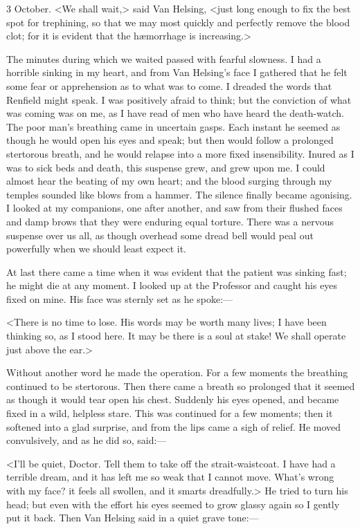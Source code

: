 \begin{diary}{3 October.}
<We shall wait,> said Van Helsing, <just long enough to fix the best spot for trephining, so that we may most quickly and perfectly remove the blood clot; for it is evident that the hæmorrhage is increasing.>

The minutes during which we waited passed with fearful slowness. I had a horrible sinking in my heart, and from Van Helsing's face I gathered that he felt some fear or apprehension as to what was to come. I dreaded the words that Renfield might speak. I was positively afraid to think; but the conviction of what was coming was on me, as I have read of men who have heard the death-watch. The poor man's breathing came in uncertain gasps. Each instant he seemed as though he would open his eyes and speak; but then would follow a prolonged stertorous breath, and he would relapse into a more fixed insensibility. Inured as I was to sick beds and death, this suspense grew, and grew upon me. I could almost hear the beating of my own heart; and the blood surging through my temples sounded like blows from a hammer. The silence finally became agonising. I looked at my companions, one after another, and saw from their flushed faces and damp brows that they were enduring equal torture. There was a nervous suspense over us all, as though overhead some dread bell would peal out powerfully when we should least expect it.

At last there came a time when it was evident that the patient was sinking fast; he might die at any moment. I looked up at the Professor and caught his eyes fixed on mine. His face was sternly set as he spoke:—

<There is no time to lose. His words may be worth many lives; I have been thinking so, as I stood here. It may be there is a soul at stake! We shall operate just above the ear.>

Without another word he made the operation. For a few moments the breathing continued to be stertorous. Then there came a breath so prolonged that it seemed as though it would tear open his chest. Suddenly his eyes opened, and became fixed in a wild, helpless stare. This was continued for a few moments; then it softened into a glad surprise, and from the lips came a sigh of relief. He moved convulsively, and as he did so, said:—

<I'll be quiet, Doctor. Tell them to take off the strait-waistcoat. I have had a terrible dream, and it has left me so weak that I cannot move. What's wrong with my face? it feels all swollen, and it smarts dreadfully.> He tried to turn his head; but even with the effort his eyes seemed to grow glassy again so I gently put it back. Then Van Helsing said in a quiet grave tone:—


\end{diary}
